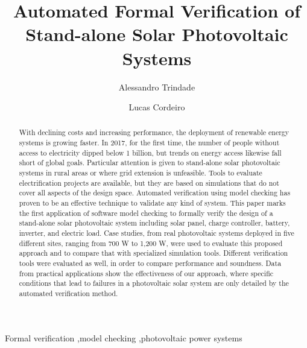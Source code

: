 \documentclass[review]{elsarticle}
\begin{document}
\begin{frontmatter}

\title{Automated Formal Verification of Stand-alone Solar Photovoltaic Systems}


\author[mymainaddress]{Alessandro Trindade}

\author[mysecondaryaddress]{Lucas Cordeiro}


\address[mymainaddress]{Federal University of Amazonas, Av. Rodrigo Octávio, 6200, Coroado I, 69077-000 Manaus-AM-Brazil}
\address[mysecondaryaddress]{University of Manchester, School of Computer Science, Kilburn Building, Manchester M13 9PL}

\begin{abstract}
With declining costs and increasing performance, the deployment of renewable energy systems is growing faster. In 2017, for the first time, the number of people without access to electricity dipped below 1 billion, but trends on energy access likewise fall short of global goals. Particular attention is given to stand-alone solar photovoltaic systems in rural areas or where grid extension is unfeasible. Tools to evaluate electrification projects are available, but they are based on simulations that do not cover all aspects of the design space. Automated verification using model checking has proven to be an effective technique to validate any kind of system. This paper marks the first application of software model checking to formally verify the design of a stand-alone solar photovoltaic system including solar panel, charge controller, battery, inverter, and electric load. Case studies, from real photovoltaic systems deployed in five different sites, ranging from 700 W to 1,200 W, were used to evaluate this proposed approach and to compare that with specialized simulation tools. Different verification tools were evaluated as well, in order to compare performance and soundness. Data from practical applications show the effectiveness of our approach, where specific conditions that lead to failures in a photovoltaic solar system are only detailed by the automated verification method.
\end{abstract}

\begin{keyword}
Formal verification \sep model checking \sep photovoltaic power systems
\end{keyword}

\end{frontmatter}
\end{document}
